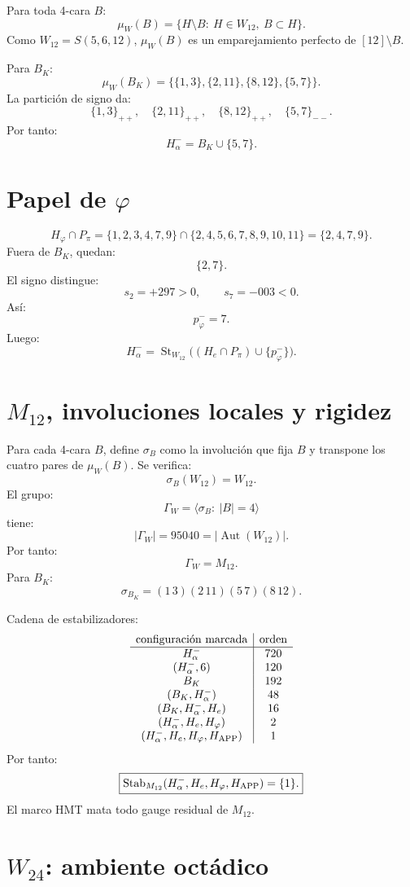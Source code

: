 \documentclass[11pt,a4paper]{article}
\newcommand{\St}{\operatorname{St}}
\newcommand{\Aut}{\operatorname{Aut}}
\newcommand{\Stab}{\operatorname{Stab}}
\begin{document}
Para toda 4-cara \(B\):
\[
\mu_W(B)=\{H\setminus B:\ H\in W_{12},\ B\subset H\}.
\]
Como \(W_{12}=S(5,6,12)\), \(\mu_W(B)\) es un emparejamiento perfecto de \([12]\setminus B\).

Para \(B_K\):
\[
\mu_W(B_K)=\{\{1,3\},\{2,11\},\{8,12\},\{5,7\}\}.
\]
La partición de signo da:
\[
\{1,3\}_{++},\quad \{2,11\}_{++},\quad \{8,12\}_{++},\quad \{5,7\}_{--}.
\]
Por tanto:
\[
\boxed{H_\alpha^-=B_K\cup\{5,7\}.}
\]

\section{Papel de \(\varphi\)}

\[
H_\varphi\cap P_\pi
=
\{1,2,3,4,7,9\}\cap\{2,4,5,6,7,8,9,10,11\}
=
\{2,4,7,9\}.
\]
Fuera de \(B_K\), quedan:
\[
\{2,7\}.
\]
El signo distingue:
\[
s_2=+297>0,\qquad s_7=-003<0.
\]
Así:
\[
p_\varphi^-=7.
\]
Luego:
\[
\boxed{
H_\alpha^-=
\St_{W_{12}}\Big((H_e\cap P_\pi)\cup\{p_\varphi^-\}\Big).
}
\]

\section{\(M_{12}\), involuciones locales y rigidez}

Para cada 4-cara \(B\), define \(\sigma_B\) como la involución que fija \(B\) y transpone los cuatro pares de \(\mu_W(B)\). Se verifica:
\[
\sigma_B(W_{12})=W_{12}.
\]
El grupo:
\[
\Gamma_W=\langle\sigma_B:\ |B|=4\rangle
\]
tiene:
\[
|\Gamma_W|=95040=|\Aut(W_{12})|.
\]
Por tanto:
\[
\boxed{\Gamma_W=M_{12}.}
\]
Para \(B_K\):
\[
\sigma_{B_K}=(1\,3)(2\,11)(5\,7)(8\,12).
\]

Cadena de estabilizadores:
\[
\begin{array}{c|c}
\text{configuración marcada} & \text{orden}\\
\hline
H_\alpha^- & 720\\
(H_\alpha^-,6) & 120\\
B_K & 192\\
(B_K,H_\alpha^-) & 48\\
(B_K,H_\alpha^-,H_e) & 16\\
(H_\alpha^-,H_e,H_\varphi) & 2\\
(H_\alpha^-,H_e,H_\varphi,H_{\rm APP}) & 1
\end{array}
\]
Por tanto:
\[
\boxed{
\Stab_{M_{12}}(H_\alpha^-,H_e,H_\varphi,H_{\rm APP})=\{1\}.
}
\]
El marco HMT mata todo gauge residual de \(M_{12}\).

\section{\(W_{24}\): ambiente octádico}
\end{document}
